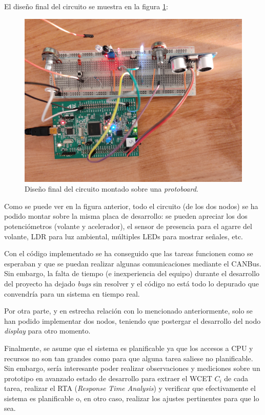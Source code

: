 El diseño final del circuito se muestra en la figura \ref{fig:final-design}:

\begin{figure}[H]
  \centering
  \includegraphics[width=\linewidth]{pictures/final-design.lq.jpg}
  \caption{Diseño final del circuito montado sobre una \textit{protoboard}.}
  \label{fig:final-design}
\end{figure}

Como se puede ver en la figura anterior, todo el circuito (de los dos nodos)
se ha podido montar sobre la misma placa de desarrollo: se pueden apreciar los
dos potenciómetros (volante y acelerador), el sensor de presencia para el agarre
del volante, LDR para luz ambiental, múltiples LEDs para mostrar señales, etc.

Con el código implementado se ha conseguido que las tareas funcionen como se esperaban
y que se puedan realizar algunas comunicaciones mediante el CANBus. Sin embargo, la
falta de tiempo (e inexperiencia del equipo) durante el desarrollo del proyecto ha
dejado \textit{bugs} sin resolver y el código no está todo lo depurado que
convendría para un sistema en tiempo real.

Por otra parte, y en estrecha relación con lo mencionado anteriormente, solo se
han podido implementar dos nodos, teniendo que postergar el desarrollo del nodo
\textit{display} para otro momento.

Finalmente, se asume que el sistema es planificable ya que los accesos a CPU y
recursos no son tan grandes como para que alguna tarea saliese no planificable.
Sin embargo, sería interesante poder realizar observaciones y mediciones sobre
un prototipo en avanzado estado de desarrollo para extraer el WCET $C_i$ de
cada tarea, realizar el RTA (\textit{Response Time Analysis}) y verificar que
efectivamente el sistema es planificable o, en otro caso, realizar los ajustes
pertinentes para que lo sea.